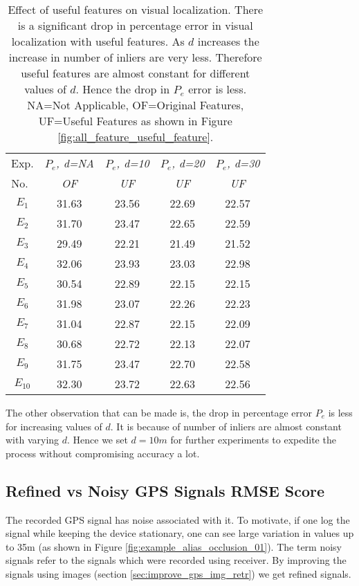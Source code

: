 \begin{table}[t]
\centering
\caption{Effect of useful features on visual localization. There is a 
significant drop in percentage error in visual localization with useful features.
As $d$ increases the increase in number of inliers are very less. Therefore useful 
features are almost constant for different values of $d$. Hence the drop 
in $P_e$ error is less. NA=Not Applicable, OF=Original Features, UF=Useful Features as shown in 
Figure \ref{fig:all_feature_useful_feature}.}
\begin{tabular}{|c|c|c|c|c|}
\hline

   Exp. &  \textit{$P_e$, d=NA} & \textit{$P_e$, d=10} & \textit{$P_e$, d=20} & \textit{$P_e$,
   d=30}\\  %
   No.~ & \textit{OF} & \textit{UF} & \textit{UF} & \textit{UF} \\ \hline
    $E_1$ & 31.63 & 23.56  & 22.69 & 22.57 \\ \hline
    $E_2$ & 31.70 & 23.47  & 22.65 & 22.59 \\ \hline
    $E_3$ & 29.49 & 22.21  & 21.49 & 21.52 \\ \hline
    $E_4$ & 32.06 & 23.93  & 23.03 & 22.98 \\ \hline
    $E_5$ & 30.54 & 22.89  & 22.15 & 22.15 \\ \hline
    $E_6$ & 31.98 & 23.07  & 22.26 & 22.23 \\ \hline
    $E_7$ & 31.04 & 22.87  & 22.15 & 22.09 \\ \hline
    $E_8$ & 30.68 & 22.72  & 22.13 & 22.07 \\ \hline
    $E_9$ & 31.75 & 23.47  & 22.70 & 22.58 \\ \hline
    $E_{10}$ & 32.30 & 23.72  & 22.63 & 22.56 \\ \hline
    \end{tabular}
\label{table:useful_feature_comparison}
\end{table}
The other observation that can be made is, the drop in percentage error $P_e$ 
is less for increasing 
values of $d$. It is because of 
number of inliers are almost constant with varying $d$.
Hence we set $d=10m$ for further experiments to expedite 
the process without compromising accuracy a lot. 

\subsection{Refined vs Noisy GPS Signals RMSE Score}
The recorded GPS signal has noise associated with it. To motivate, if one log the
\gps signal while keeping the device stationary, one can see  large
variation in \gps values up to 35m (as shown in Figure \ref{fig:example_alias_occlusion_01}). 
The term noisy \gps signals refer to the \gps signals 
which were recorded using \gps receiver. By improving the
\gps signals using images (section \ref{sec:improve_gps_img_retr}) we get refined \gps signals.

